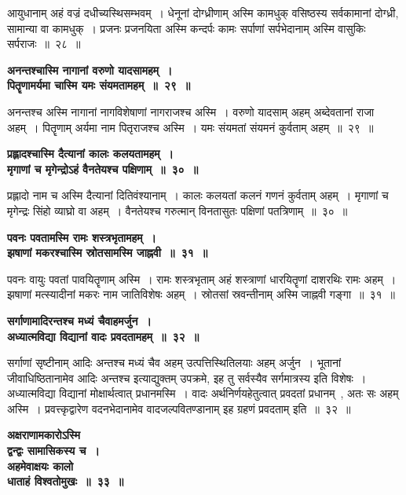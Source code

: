 आयुधानाम् अहं वज्रं दधीच्यस्थिसम्भवम्~। धेनूनां दोग्ध्रीणाम् अस्मि कामधुक् वसिष्ठस्य सर्वकामानां दोग्ध्री, सामान्या वा कामधुक्~। प्रजनः प्रजनयिता अस्मि कन्दर्पः कामः सर्पाणां सर्पभेदानाम् अस्मि वासुकिः सर्पराजः~॥~२८~॥\par
 \begin{center}{\bfseries अनन्तश्चास्मि नागानां वरुणो यादसामहम्~।\\पितॄणामर्यमा चास्मि यमः संयमतामहम्~॥~२९~॥}\end{center} 
अनन्तश्च अस्मि नागानां नागविशेषाणां नागराजश्च अस्मि~। वरुणो यादसाम् अहम् अब्देवतानां राजा अहम्~। पितॄणाम् अर्यमा नाम पितृराजश्च अस्मि~। यमः संयमतां संयमनं कुर्वताम् अहम्~॥~२९~॥\par
 \begin{center}{\bfseries प्रह्लादश्चास्मि दैत्यानां कालः कलयतामहम्~।\\मृगाणां च मृगेन्द्रोऽहं वैनतेयश्च पक्षिणाम्~॥~३०~॥}\end{center} 
प्रह्लादो नाम च अस्मि दैत्यानां दितिवंश्यानाम्~। कालः कलयतां कलनं गणनं कुर्वताम् अहम्~। मृगाणां च मृगेन्द्रः सिंहो व्याघ्रो वा अहम्~। वैनतेयश्च गरुत्मान् विनतासुतः पक्षिणां पतत्रिणाम्~॥~३०~॥\par
 \begin{center}{\bfseries पवनः पवतामस्मि रामः शस्त्रभृतामहम्~।\\झषाणां मकरश्चास्मि स्रोतसामस्मि जाह्नवी~॥~३१~॥}\end{center} 
पवनः वायुः पवतां पावयितॄणाम् अस्मि~। रामः शस्त्रभृताम् अहं शस्त्राणां धारयितॄणां दाशरथिः रामः अहम्~। झषाणां मत्स्यादीनां मकरः नाम जातिविशेषः अहम्~। स्रोतसां स्रवन्तीनाम् अस्मि जाह्नवी गङ्गा~॥~३१~॥\par
 \begin{center}{\bfseries सर्गाणामादिरन्तश्च मध्यं चैवाहमर्जुन~।\\अध्यात्मविद्या विद्यानां वादः प्रवदतामहम्~॥~३२~॥}\end{center} 
सर्गाणां सृष्टीनाम् आदिः अन्तश्च मध्यं चैव अहम् उत्पत्तिस्थितिलयाः अहम् अर्जुन~। भूतानां जीवाधिष्ठितानामेव आदिः अन्तश्च इत्याद्युक्तम् उपक्रमे, इह तु सर्वस्यैव सर्गमात्रस्य इति विशेषः~। अध्यात्मविद्या विद्यानां मोक्षार्थत्वात् प्रधानमस्मि~। वादः अर्थनिर्णयहेतुत्वात् प्रवदतां प्रधानम्~, अतः सः अहम् अस्मि~। प्रवत्त्कृद्वारेण वदनभेदानामेव वादजल्पवितण्डानाम् इह ग्रहणं प्रवदताम् इति~॥~३२~॥\par
 \begin{center}{\bfseries अक्षराणामकारोऽस्मि\\ द्वन्द्वः सामासिकस्य च~।\\अहमेवाक्षयः कालो\\ धाताहं विश्वतोमुखः~॥~३३~॥}\end{center} 
